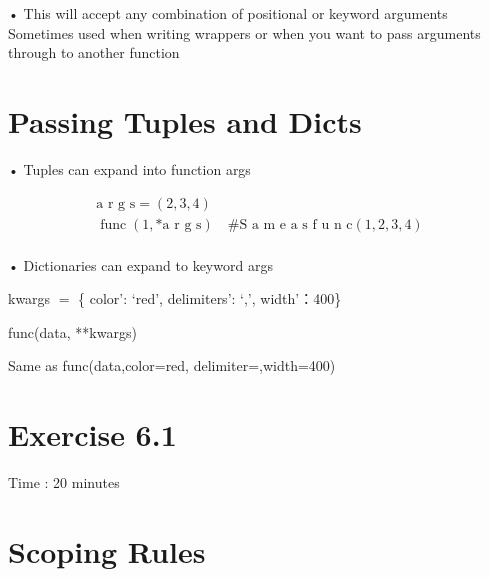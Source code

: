 \documentclass[
  letterpaper,
  DIV=11,
  numbers=noendperiod]{scrreprt}
\newenvironment{Shaded}{\begin{snugshade}}{\end{snugshade}}
\newcommand{\NormalTok}[1]{\textcolor[rgb]{0.00,0.23,0.31}{#1}}
\begin{document}
• This will accept any combination of positional or keyword arguments\\
Sometimes used when writing wrappers or when you want to pass arguments
through to another function


\chapter{Passing Tuples and Dicts}\label{passing-tuples-and-dicts}

• Tuples can expand into function args

\[
\begin{array}{l} \text {a r g s} = (2, 3, 4) \\ \operatorname {f u n c} (1, * \text {a r g s}) \quad \# \text {S a m e a s f u n c} (1, 2, 3, 4) \\ \end{array}
\]

• Dictionaries can expand to keyword args

kwargs \(=\) \{ color': `red', delimiters': `,', width'：400\}

\begin{Shaded}
\begin{Highlighting}[]
\NormalTok{func(data, **kwargs) }
\end{Highlighting}
\end{Shaded}

\begin{Shaded}
\begin{Highlighting}[]
\NormalTok{Same as func(data,color=\textquotesingle{}red\textquotesingle{}, delimiter=\textquotesingle{},\textquotesingle{}width=400) }
\end{Highlighting}
\end{Shaded}


\chapter{Exercise 6.1}\label{exercise-6.1}

Time : 20 minutes


\chapter{Scoping Rules}\label{scoping-rules}
\end{document}
